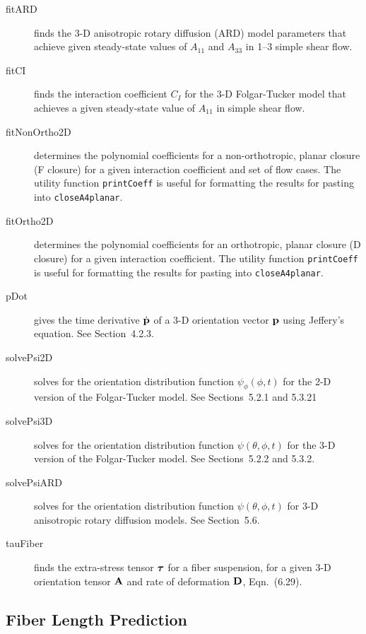 \documentclass[11pt]{article}
\begin{document}
\begin{description}
    \item[fitARD]{finds the 3-D anisotropic rotary diffusion (ARD) model parameters that achieve given steady-state values of $A_{11}$ and $A_{33}$ in 1--3 simple shear flow.}  
    
    \item[fitCI]{finds the interaction coefficient $C_I$ for the 3-D Folgar-Tucker model that achieves a given steady-state value of $A_{11}$ in simple shear flow.}
    
    \item[fitNonOrtho2D]{determines the polynomial coefficients for a non-orthotropic, planar closure (F closure) for a given interaction coefficient and set of flow cases.  The utility function \texttt{printCoeff} is useful for formatting the results for pasting into \texttt{closeA4planar}.}
    
    \item[fitOrtho2D]{determines the polynomial coefficients for an orthotropic, planar closure (D closure) for a given interaction coefficient.  The utility function \texttt{printCoeff} is useful for formatting the results for pasting into \texttt{closeA4planar}.}
    
    \item[pDot]{gives the time derivative $\dot{ \mathbf{p}}$ of a 3-D orientation vector $\mathbf{p}$ using Jeffery's equation.  See Section~4.2.3.}
    
    \item[solvePsi2D]{solves for the orientation distribution function $\psi_\phi ( \phi, t)$ for the 2-D version of the Folgar-Tucker model.  See Sections~5.2.1 and 5.3.21}
    
    \item[solvePsi3D]{solves for the orientation distribution function $\psi( \theta, \phi, t)$ for the 3-D version of the Folgar-Tucker model.  See Sections~5.2.2 and 5.3.2.}
    
    \item[solvePsiARD]{solves for the orientation distribution function $\psi( \theta, \phi, t)$ for 3-D anisotropic rotary diffusion models.  See Section~5.6.}
    
    \item[tauFiber]{finds the extra-stress tensor $\boldsymbol{\tau}$ for a fiber suspension, for a given 3-D orientation tensor $\mathbf{A}$ and rate of deformation $\mathbf{D}$, Eqn.~(6.29).}
    
\end{description}

\subsection{Fiber Length Prediction}
\end{document}
